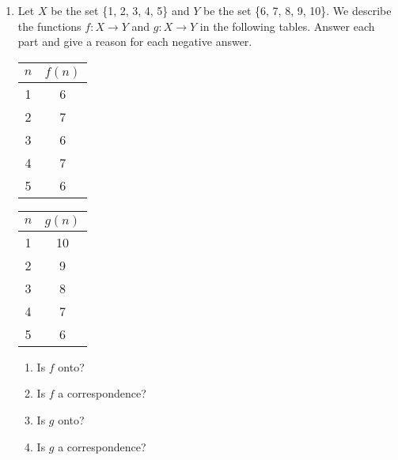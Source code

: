 \documentclass{article}
\begin{document}
\begin{enumerate}
        \item Let $X$ be the set \{1, 2, 3, 4, 5\} and $Y$ be the set \{6, 7, 8, 9, 10\}. 
        We describe the functions $f : X\rightarrow Y$ and $g : X \rightarrow Y$ in the 
        following tables. Answer each part and give a reason for each negative answer.
        \begin{center}
            \begin{tabular}{c|c}
                $n$ & $f(n)$\\
                \hline
                1 & 6\\
                2 & 7\\
                3 & 6\\
                4 & 7\\
                5 & 6
            \end{tabular}
            \quad
            \begin{tabular}{c | c}
                $n$ & $g(n)$\\
                \hline
                1 & 10\\
                2 & 9\\
                3 & 8\\
                4 & 7\\
                5 & 6
            \end{tabular}
        \end{center}
        \begin{enumerate}
            \item Is $f$ onto?
            \item Is $f$ a correspondence?
            \item Is $g$ onto?
            \item Is $g$ a correspondence?
        \end{enumerate}


\end{enumerate}
\end{document}
